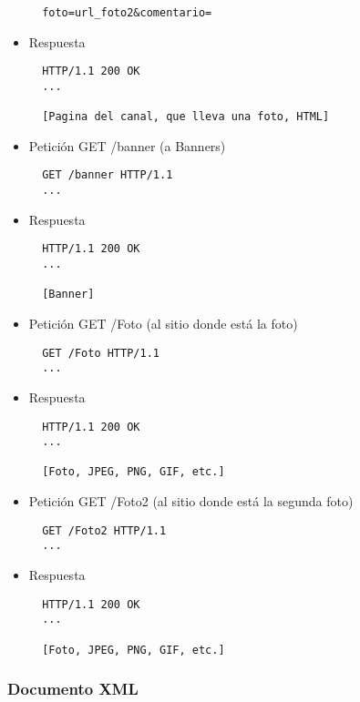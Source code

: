 \begin{itemize}
\begin{verbatim}
  foto=url_foto2&comentario=
\end{verbatim}

\item Respuesta

\begin{verbatim}
  HTTP/1.1 200 OK
  ...

  [Pagina del canal, que lleva una foto, HTML]
\end{verbatim}

\item Petición GET /banner (a Banners)

\begin{verbatim}
  GET /banner HTTP/1.1
  ...
\end{verbatim}

\item Respuesta

\begin{verbatim}
  HTTP/1.1 200 OK
  ...

  [Banner]
\end{verbatim}

\item Petición GET /Foto (al sitio donde está la foto)

\begin{verbatim}
  GET /Foto HTTP/1.1
  ...
\end{verbatim}

\item Respuesta

\begin{verbatim}
  HTTP/1.1 200 OK
  ...

  [Foto, JPEG, PNG, GIF, etc.]
\end{verbatim}

\item Petición GET /Foto2 (al sitio donde está la segunda foto)

\begin{verbatim}
  GET /Foto2 HTTP/1.1
  ...
\end{verbatim}

\item Respuesta

\begin{verbatim}
  HTTP/1.1 200 OK
  ...

  [Foto, JPEG, PNG, GIF, etc.]
\end{verbatim}

\end{itemize}


\subsubsection*{Documento XML}


